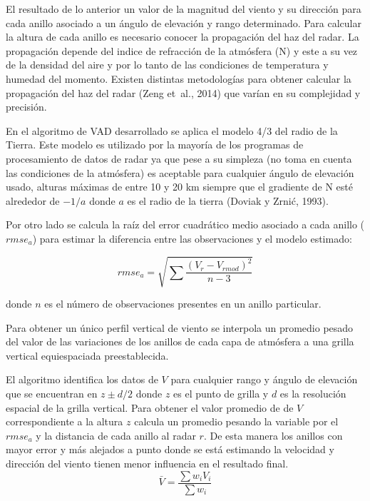 \documentclass[12pt,spanish,oneside]{book}
\begin{document}
El resultado de lo anterior un valor de la magnitud del viento y su
dirección para cada anillo asociado a un ángulo de elevación y rango
determinado. Para calcular la altura de cada anillo es necesario conocer
la propagación del haz del radar. La propagación depende del indice de
refracción de la atmósfera (N) y este a su vez de la densidad del aire y
por lo tanto de las condiciones de temperatura y humedad del momento.
Existen distintas metodologías para obtener calcular la propagación del
haz del radar (Zeng et~al., 2014) que varían en su complejidad y
precisión.

En el algoritmo de VAD desarrollado se aplica el modelo 4/3 del radio de
la Tierra. Este modelo es utilizado por la mayoría de los programas de
procesamiento de datos de radar ya que pese a su simpleza (no toma en
cuenta las condiciones de la atmósfera) es aceptable para cualquier
ángulo de elevación usado, alturas máximas de entre 10 y 20 km siempre
que el gradiente de N esté alrededor de \(-1/a\) donde \(a\) es el radio
de la tierra (Doviak y Zrnić, 1993).

Por otro lado se calcula la raíz del error cuadrático medio asociado a
cada anillo (\(rmse_a\)) para estimar la diferencia entre las
observaciones y el modelo estimado:

\begin{equation}\label{eq-vr8}
rmse_a = \sqrt {\sum \frac {(V_r - V_{rmod} )^2} {n-3}}
\end{equation}

donde \(n\) es el número de observaciones presentes en un anillo
particular.

Para obtener un único perfil vertical de viento se interpola un promedio
pesado del valor de las variaciones de los anillos de cada capa de
atmósfera a una grilla vertical equiespaciada preestablecida.

El algoritmo identifica los datos de \(V\) para cualquier rango y ángulo
de elevación que se encuentran en \(z \pm d/2\) donde \(z\) es el punto
de grilla y \(d\) es la resolución espacial de la grilla vertical. Para
obtener el valor promedio de de \(V\) correspondiente a la altura \(z\)
calcula un promedio pesando la variable por el \(rmse_a\) y la distancia
de cada anillo al radar \(r\). De esta manera los anillos con mayor
error y más alejados a punto donde se está estimando la velocidad y
dirección del viento tienen menor influencia en el resultado final.\\

\begin{equation}\label{eq-vr9}
\bar{V} = \frac {\sum w_i V_i} {\sum w_i}
\end{equation}
\end{document}

